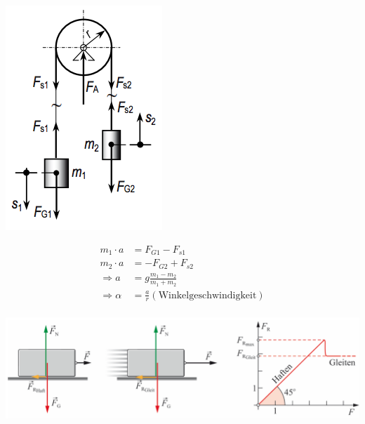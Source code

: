 \documentclass[
a4paper,
oneside,
landscape, 
8pt,
]{scrartcl}
\begin{document}
\begin{multicols*}{2}
\begin{minipage}[h!]{0.2\linewidth}
	\includegraphics[width=0.9\linewidth]{images/kraefte_gleichgewicht}
\end{minipage}
\hfill
\begin{minipage}[h!]{0.4\linewidth}
\begin{align*}
m_1 \cdot a & = F_{G1} - F_{s1} \\
m_2 \cdot a & = -F_{G2} + F_{s2} \\
\Rightarrow a&=g\frac{m_1-m_2}{m_1+m_2}  \\
\Rightarrow \alpha &= \frac{a}{r} (\text{Winkelgeschwindigkeit})\\
\end{align*}
\end{minipage}

\includegraphics[width=0.9\linewidth]{images/haft_gleitkraft}



\end{multicols*}
\end{document}
